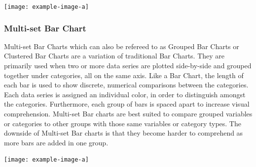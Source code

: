 \texttt{[image: example-image-a]} 

\subsubsection{Multi-set Bar Chart}
Multi-set Bar Charts which can also be refereed to as Grouped Bar Charts or Clustered 
Bar Charts are a variation of traditional Bar Charts. They are primarily used when 
two or more data series are plotted side-by-side and grouped together under categories, 
all on the same axis. Like a Bar Chart, the length of each bar is used to show 
discrete, numerical comparisons between the categories. Each data series is assigned 
an individual color, in order to distinguish amongst the categories. Furthermore, 
each group of bars is spaced apart to increase visual comprehension. Multi-set 
Bar charts are best suited to compare grouped variables or categories to other 
groups with those same variables or category types. The downside of Multi-set Bar 
charts is that they become harder to comprehend as more bars are added in one 
group.

\texttt{[image: example-image-a]} 